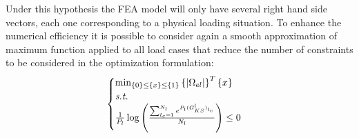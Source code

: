 Under this hypothesis the FEA model will only have several right hand side vectors, each one corresponding to a physical loading situation. To enhance the numerical efficiency it is possible to consider again a smooth approximation of maximum function applied to all load cases that reduce the number of constraints to be considered in the optimization formulation:
\begin{equation}
\begin{cases}
\min_{\left\lbrace{0}\right \rbrace\leq\left\lbrace{x}\right \rbrace\leq\left\lbrace{1}\right \rbrace} {\left\lbrace{|\Omega_{el}|}\right \rbrace^T\left\lbrace{x}\right \rbrace} \\
\textit{s.t.}\\
\frac{1}{P_l}\log{\left(\frac{\sum_{l_c=1}^{N_l}e^{P_l(G^{l}_{KS})_{l_c}}}{N_l}\right)}\leq 0 \\
\end{cases}
\end{equation}
